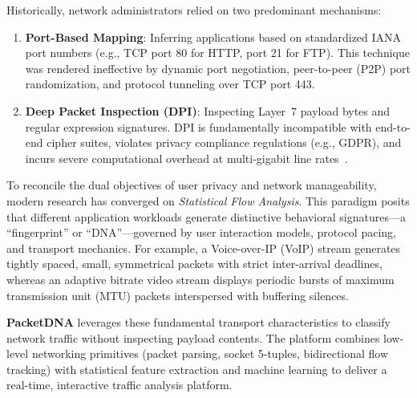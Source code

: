 \documentclass[10pt,journal,compsoc]{IEEEtran}
\begin{document}
Historically, network administrators relied on two predominant mechanisms:
\begin{enumerate}
    \item \textbf{Port-Based Mapping}: Inferring applications based on standardized IANA port numbers (e.g., TCP port 80 for HTTP, port 21 for FTP). This technique was rendered ineffective by dynamic port negotiation, peer-to-peer (P2P) port randomization, and protocol tunneling over TCP port 443.
    \item \textbf{Deep Packet Inspection (DPI)}: Inspecting Layer~7 payload bytes and regular expression signatures. DPI is fundamentally incompatible with end-to-end cipher suites, violates privacy compliance regulations (e.g., GDPR), and incurs severe computational overhead at multi-gigabit line rates~\cite{nguyen2008survey}.
\end{enumerate}

To reconcile the dual objectives of user privacy and network manageability, modern research has converged on \textit{Statistical Flow Analysis}. This paradigm posits that different application workloads generate distinctive behavioral signatures---a ``fingerprint'' or ``DNA''---governed by user interaction models, protocol pacing, and transport mechanics. For example, a Voice-over-IP (VoIP) stream generates tightly spaced, small, symmetrical packets with strict inter-arrival deadlines, whereas an adaptive bitrate video stream displays periodic bursts of maximum transmission unit (MTU) packets interspersed with buffering silences.

\textbf{PacketDNA} leverages these fundamental transport characteristics to classify network traffic without inspecting payload contents. The platform combines low-level networking primitives (packet parsing, socket 5-tuples, bidirectional flow tracking) with statistical feature extraction and machine learning to deliver a real-time, interactive traffic analysis platform.
\end{document}
